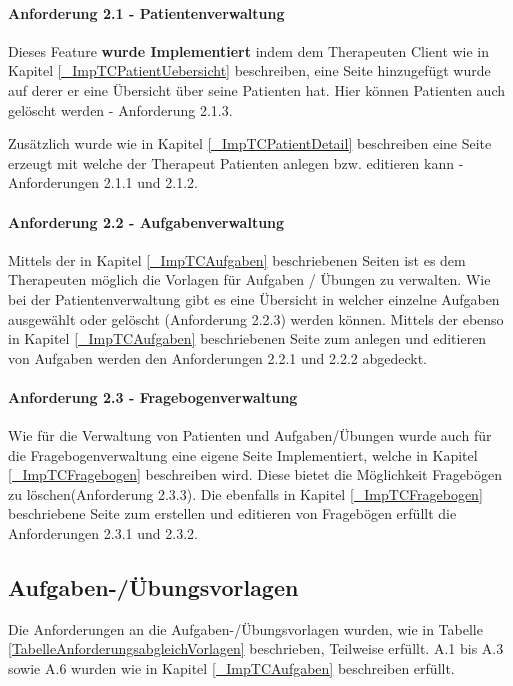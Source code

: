 \paragraph{Anforderung 2.1 - Patientenverwaltung}
Dieses Feature \textbf{wurde Implementiert} indem dem Therapeuten Client wie in Kapitel \ref{_ImpTCPatientUebersicht} beschreiben, eine Seite hinzugefügt wurde auf derer er eine Übersicht über seine Patienten hat. Hier können Patienten auch gelöscht werden - Anforderung 2.1.3.

Zusätzlich wurde wie in Kapitel \ref{_ImpTCPatientDetail} beschreiben eine Seite erzeugt mit welche der Therapeut Patienten anlegen bzw. editieren kann - Anforderungen 2.1.1 und 2.1.2.

\paragraph{Anforderung 2.2 - Aufgabenverwaltung}
Mittels der in Kapitel \ref{_ImpTCAufgaben} beschriebenen Seiten ist es dem Therapeuten möglich die Vorlagen für Aufgaben / Übungen zu verwalten. Wie bei der Patientenverwaltung gibt es eine Übersicht in welcher einzelne Aufgaben ausgewählt oder gelöscht (Anforderung 2.2.3) werden können. Mittels der ebenso in Kapitel \ref{_ImpTCAufgaben} beschriebenen Seite zum anlegen und editieren von Aufgaben werden den Anforderungen 2.2.1 und 2.2.2 abgedeckt.

\paragraph{Anforderung 2.3 - Fragebogenverwaltung}
Wie für die Verwaltung von Patienten und Aufgaben/Übungen wurde auch für die Fragebogenverwaltung eine eigene Seite Implementiert, welche in Kapitel \ref{_ImpTCFragebogen} beschreiben wird. Diese bietet die Möglichkeit Fragebögen zu löschen(Anforderung 2.3.3). Die ebenfalls in Kapitel \ref{_ImpTCFragebogen} beschriebene Seite zum erstellen und editieren von Fragebögen erfüllt die Anforderungen 2.3.1 und 2.3.2.

\subsection{Aufgaben-/Übungsvorlagen}
Die Anforderungen an die Aufgaben-/Übungsvorlagen wurden, wie in Tabelle \ref{TabelleAnforderungsabgleichVorlagen} beschrieben, Teilweise erfüllt.
A.1 bis A.3 sowie A.6 wurden wie in Kapitel \ref{_ImpTCAufgaben} beschreiben erfüllt. 

